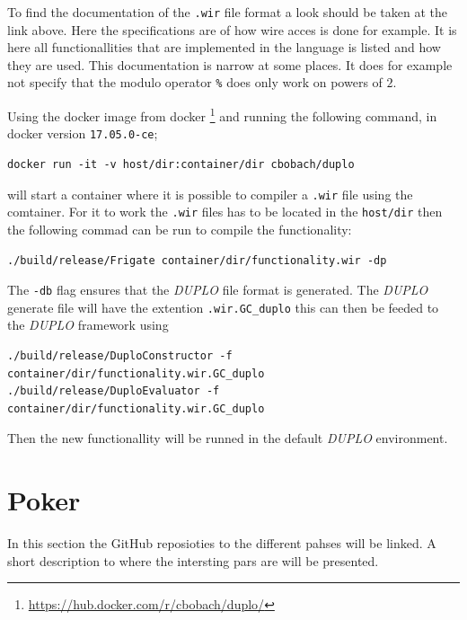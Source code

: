 \documentclass[twoside,11pt,openright]{report}
\newcommand{\DUPLO}{\textit{DUPLO} }
\begin{document}
\begin{appendices}
To find the documentation of the \verb|.wir| file format a look should be taken at the link above. Here the specifications are of how wire acces is done for example. It is here all functionallities that are implemented in the language is listed and how they are used. This documentation is narrow at some places. It does for example not specify that the modulo operator \verb|%| does only work on powers of $2$.

\bigskip

Using the docker image from docker \footnote{\url{https://hub.docker.com/r/cbobach/duplo/}} and running the following command, in docker version \verb|17.05.0-ce|;

\begin{center}
\begin{verbatim}
docker run -it -v host/dir:container/dir cbobach/duplo
\end{verbatim}
\end{center}

will start a container where it is possible to compiler a \verb|.wir| file using the comtainer. For it to work the \verb|.wir| files has to be located in the \verb|host/dir| then the following commad can be run to compile the functionality:

\begin{center}
\begin{verbatim}
./build/release/Frigate container/dir/functionality.wir -dp
\end{verbatim}
\end{center}

The \verb|-db| flag ensures that the \DUPLO file format is generated. The \DUPLO generate file will have the extention \verb|.wir.GC_duplo| this can then be feeded to the \DUPLO framework using

\begin{center}
\begin{verbatim}
./build/release/DuploConstructor -f container/dir/functionality.wir.GC_duplo
./build/release/DuploEvaluator -f container/dir/functionality.wir.GC_duplo
\end{verbatim}
\end{center}

Then the new functionallity will be runned in the default \DUPLO environment.

\section{Poker}
\label{app:poker}
In this section the GitHub reposioties to the different pahses will be linked. A short description to where the intersting pars are will be presented.


\end{appendices}
\end{document}
